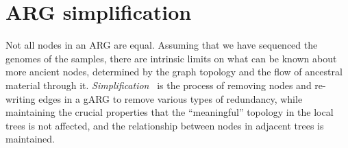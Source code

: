 \documentclass{article}
\begin{document}


\section*{ARG simplification}\label{ARG_simplification}

Not all nodes in an ARG are equal. Assuming that we have sequenced the
genomes of the samples, there are intrinsic limits on what can
be known about more ancient nodes, determined by the graph topology
and the flow of ancestral material through it.
\emph{Simplification}~\citep{kelleher2018efficient} is the process
of removing nodes and re-writing edges in a gARG to remove
various types of redundancy, while maintaining the crucial properties
that the ``meaningful'' topology in the local trees is not affected,
and the relationship between nodes in adjacent trees is maintained.
\end{document}

